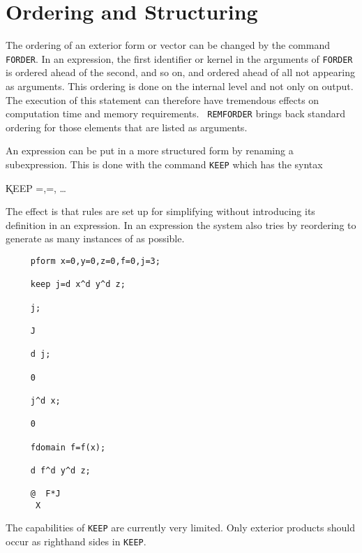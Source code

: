 \section{Ordering and Structuring}

 
The ordering of an exterior form or vector can be changed by the
command {\tt FORDER}.\label{FORDER}  In an expression, the first
identifier or kernel in the arguments of {\tt FORDER} is ordered ahead
of the second, and so on, and ordered ahead of all not appearing as
arguments.  This ordering is done on the internal level and not only
on output.  The execution of this statement can therefore have
tremendous effects on computation time and memory requirements.  {\tt
REMFORDER}\label{REMFORDER} brings back standard ordering for those
elements that are listed as arguments. 

An expression can be put in a more structured form by renaming a
subexpression.  This is done with the command {\tt KEEP} which
has the syntax \label{KEEP}

\hspace*{2em} \k{KEEP}
=,=, \ldots

The effect is that rules are set up for simplifying  without
introducing its definition in an expression. In an expression the system
also tries by reordering to generate as many instances of  as
possible.

\example{}

\begin{verbatim}
     pform x=0,y=0,z=0,f=0,j=3;

     keep j=d x^d y^d z;

     j;

     J

     d j;

     0

     j^d x;

     0

     fdomain f=f(x);

     d f^d y^d z;

     @  F*J
      X
\end{verbatim}

The capabilities of {\tt KEEP} are currently very limited.  Only exterior
products should occur as righthand sides in {\tt KEEP}.


